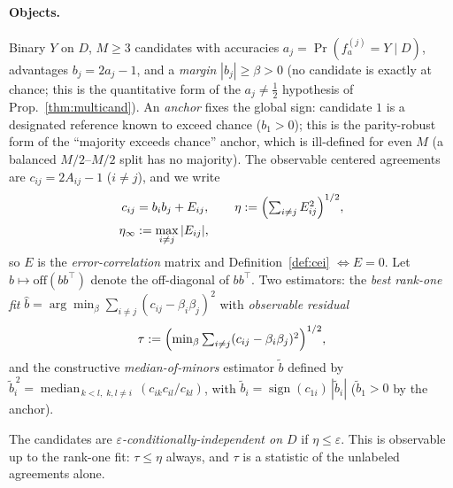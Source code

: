\paragraph{Objects.} Binary $Y$ on $D$, $M\ge3$ candidates with accuracies
$a_j=\Pr(f_a^{(j)}{=}Y\mid D)$, advantages $b_j=2a_j-1$, and a \emph{margin}
$|b_j|\ge\beta>0$ (no candidate is exactly at chance; this is the quantitative
form of the $a_j\neq\tfrac12$ hypothesis of Prop.~\ref{thm:multicand}). An
\emph{anchor} fixes the global sign: candidate $1$ is a designated reference
known to exceed chance ($b_1>0$); this is the parity-robust form of the
``majority exceeds chance'' anchor, which is ill-defined for even $M$ (a balanced
$M/2$--$M/2$ split has no majority). The observable centered agreements are
$c_{ij}=2A_{ij}-1$ ($i\neq j$), and we write
\[
\begin{aligned}
c_{ij} &=b_ib_j+E_{ij},\qquad
\eta:=\Bigl(\textstyle\sum_{i\neq j}E_{ij}^2\Bigr)^{1/2},\\
\eta_\infty &:=\max_{i\neq j}|E_{ij}|,
\end{aligned}
\]
so $E$ is the \emph{error-correlation} matrix and Definition~\ref{def:cei}
$\iff E=0$. Let $b\mapsto\mathrm{off}(bb^\top)$ denote the off-diagonal of
$bb^\top$. Two estimators: the \emph{best rank-one fit}
$\widehat b=\arg\min_\beta\sum_{i\neq j}(c_{ij}-\beta_i\beta_j)^2$ with
\emph{observable residual}
\[
\tau:=\Bigl(\textstyle\min_\beta\sum_{i\neq j}(c_{ij}-\beta_i\beta_j)^2\Bigr)^{1/2},
\]
and the constructive \emph{median-of-minors} estimator $\widetilde b$ defined by
$\widetilde b_i^{\,2}=\operatorname{median}_{\,k<l,\;k,l\neq
i}\,(c_{ik}c_{il}/c_{kl})$, with $\widetilde b_i=\operatorname{sign}(c_{1i})\,
|\widetilde b_i|$ ($\widetilde b_1>0$ by the anchor).

\begin{definition}\label{def:approx-cei}
The candidates are \emph{$\varepsilon$-conditionally-independent on $D$} if
$\eta\le\varepsilon$. This is observable up to the rank-one fit: $\tau\le\eta$
always, and $\tau$ is a statistic of the unlabeled agreements alone.
\end{definition}


